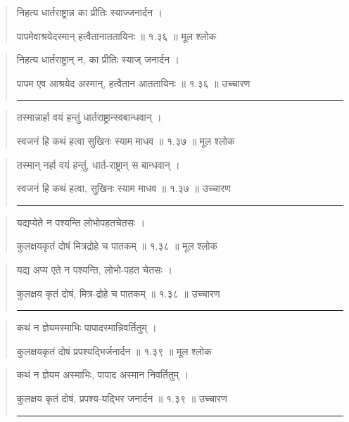 \begin{quotation} 

निहत्य धार्तराष्ट्रान्न का प्रीतिः स्याज्जनार्दन  ।  


पापमेवाश्रयेदस्मान्‌ हत्वैतानाततायिनः  ॥ १.३६ ॥  मूल श्लोक
\end{quotation}

\begin{quotation}

निहत्य धार्तराष्ट्रान् न, का प्रीतिः स्याज् जनार्दन ।  


पापम एव आश्रयेद अस्मान्‌, हत्वैतान आततायिनः  ॥ १.३६ ॥  उच्चारण

\noindent\rule{16cm}{0.4pt} 
\end{quotation}


\begin{quotation} 

तस्मान्नार्हा वयं हन्तुं धार्तराष्ट्रान्स्वबान्धवान्‌  ।  
 

स्वजनं हि कथं हत्वा सुखिनः स्याम माधव  ॥ १.३७ ॥  मूल श्लोक
\end{quotation}

\begin{quotation}

तस्मान् नर्हा वयं हन्तुं, धार्त-राष्ट्रान् स बान्धवान्  ।  


स्वजनं हि कथं हत्वा, सुखिनः स्याम माधव  ॥ १.३७ ॥  उच्चारण

\noindent\rule{16cm}{0.4pt}
\end{quotation}


\begin{quotation}
यद्यप्येते न पश्यन्ति लोभोपहतचेतसः  ।  

कुलक्षयकृतं दोषं मित्रद्रोहे च पातकम्‌  ॥ १.३८ ॥  मूल श्लोक
\end{quotation}

\begin{quotation}

यद्य अप्य एते न पश्यन्ति, लोभो-पहत चेतसः  ।  


कुलक्षय कृतं दोषं, मित्र-द्रोहे च पातकम्  ॥ १.३८ ॥  उच्चारण

\noindent\rule{16cm}{0.4pt} 
\end{quotation}


\begin{quotation} 
कथं न ज्ञेयमस्माभिः पापादस्मान्निवर्तितुम्‌  ।  


कुलक्षयकृतं दोषं प्रपश्यद्भिर्जनार्दन  ॥ १.३९ ॥  मूल श्लोक
\end{quotation}

\begin{quotation}

कथं न ज्ञेयम अस्माभिः, पापाद अस्मान निवर्तितुम्‌  ।  


कुलक्षय कृतं दोषं, प्रपश्य-यद्भिर जनार्दन  ॥ १.३९ ॥  उच्चारण

\noindent\rule{16cm}{0.4pt} 
\end{quotation}


